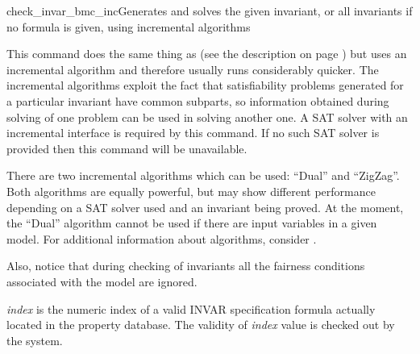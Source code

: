 \begin{nusmvCommand}{check\_invar\_bmc\_inc}{Generates and solves the given 
invariant, or all invariants if no formula is given, using incremental algorithms}
 

This command does the same thing as  (see the
description on page \pageref{checkInvarBmcCommand}) but uses an
incremental algorithm and therefore usually runs considerably
quicker. The incremental algorithms exploit the fact that
satisfiability problems generated for a particular invariant have
common subparts, so information obtained during solving of one problem
can be used in solving another one. A SAT solver with an incremental
interface is required by this command. If no such SAT solver is
provided then this command will be unavailable.

There are two incremental algorithms which can be used: ``Dual'' and
``ZigZag''. Both algorithms are equally powerful, but may show
different performance depending on a SAT solver used and an invariant
being proved.  At the moment, the ``Dual'' algorithm cannot be used if
there are input variables in a given model. For additional information
about algorithms, consider \cite{een04temporal}.

Also, notice that during checking of invariants all the fairness
conditions associated with the model are ignored.

\begin{cmdOpt}

 { {\it index} is the numeric index of a valid
INVAR specification formula actually located in the property
database.  The validity of {\it index} value is checked out by the
system.}
       
            


\end{cmdOpt}

\end{nusmvCommand}
